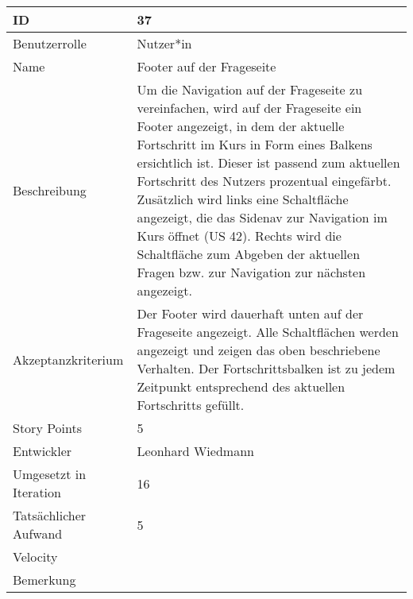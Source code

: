 \begin{tabularx}{\textwidth}{|p{}|X|}
	\hline
	ID & 37\\
	\hline
	Benutzerrolle & Nutzer*in\\
	\hline
	Name & Footer auf der Frageseite\\
	\hline
	Beschreibung & Um die Navigation auf der Frageseite zu vereinfachen, wird auf der Frageseite ein Footer angezeigt, in dem der aktuelle Fortschritt im Kurs in Form eines Balkens ersichtlich ist. Dieser ist passend zum aktuellen Fortschritt des Nutzers prozentual eingefärbt. Zusätzlich wird links eine Schaltfläche angezeigt, die das Sidenav zur Navigation im Kurs öffnet (US 42). Rechts wird die Schaltfläche zum Abgeben der aktuellen Fragen bzw. zur Navigation zur nächsten angezeigt.\\
	\hline
	Akzeptanzkriterium & Der Footer wird dauerhaft unten auf der Frageseite angezeigt. Alle Schaltflächen werden angezeigt und zeigen das oben beschriebene Verhalten. Der Fortschrittsbalken ist zu jedem Zeitpunkt entsprechend des aktuellen Fortschritts gefüllt.\\
	\hline
	Story Points & 5\\
	\hline
	Entwickler & Leonhard Wiedmann\\
	\hline
	Umgesetzt in Iteration & 16\\
	\hline
	Tatsächlicher Aufwand & 5 \\
	\hline
	Velocity & \\
	\hline
	Bemerkung & \\
	\hline
\end{tabularx}
\vspace{20pt}
